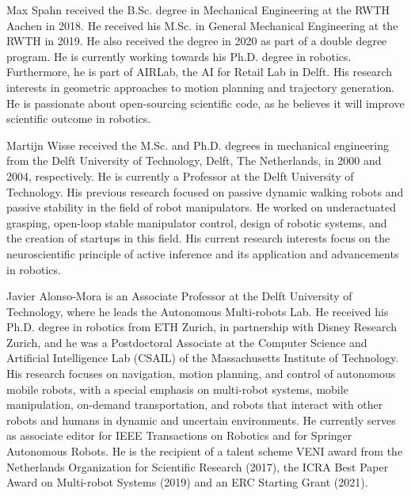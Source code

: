 \begin{IEEEbiography}
  {Max Spahn} received the B.Sc. degree in Mechanical Engineering at the RWTH
  Aachen in 2018. He received his M.Sc. in General Mechanical Engineering at
  the RWTH in 2019. He also received the degree 
  in 2020 as part of a double degree program.
 He is currently working towards his Ph.D. degree in robotics. Furthermore, he
  is part of AIRLab, the AI for Retail Lab in Delft. His research interests
  in geometric approaches to motion planning and trajectory generation. He is
  passionate about open-sourcing scientific code, as he believes it will improve
  scientific outcome in robotics.
\end{IEEEbiography}
\vspace{-15mm}
\begin{IEEEbiography}{Martijn Wisse}
  received the M.Sc. and Ph.D. degrees in mechanical engineering from the Delft
  University of Technology, Delft, The Netherlands, in 2000 and 2004,
  respectively. He is currently a Professor at the Delft University of Technology.
  His previous research focused on passive dynamic walking robots and passive
  stability in the field of robot manipulators. He worked on underactuated
  grasping, open-loop stable manipulator control, design of robotic systems, and
  the creation of startups in this field. His current research interests focus on
  the neuroscientific principle of active inference and its application and
  advancements in robotics. 
\end{IEEEbiography}
\vspace{-15mm}
\begin{IEEEbiography}{Javier Alonso-Mora}
  is an Associate Professor at the Delft University of
  Technology, where he leads the Autonomous Multi-robots Lab. He received his
  Ph.D. degree in robotics 
  from ETH Zurich, in partnership with Disney Research
  Zurich, and he was a Postdoctoral Associate at the Computer Science and
  Artificial Intelligence Lab (CSAIL) of the Massachusetts Institute of
  Technology. His research focuses on navigation, motion planning, and control of
  autonomous mobile robots, with a special emphasis on multi-robot systems, mobile
  manipulation, on-demand transportation, and robots that interact with other
  robots and humans in dynamic and uncertain environments. He currently serves as
  associate editor for IEEE Transactions on Robotics and for Springer Autonomous
  Robots. He is the recipient of a talent scheme VENI award from the Netherlands
  Organization for Scientific Research (2017), the ICRA Best Paper Award on
  Multi-robot Systems (2019) and an ERC Starting Grant (2021).
\end{IEEEbiography}
\vspace{27em}

